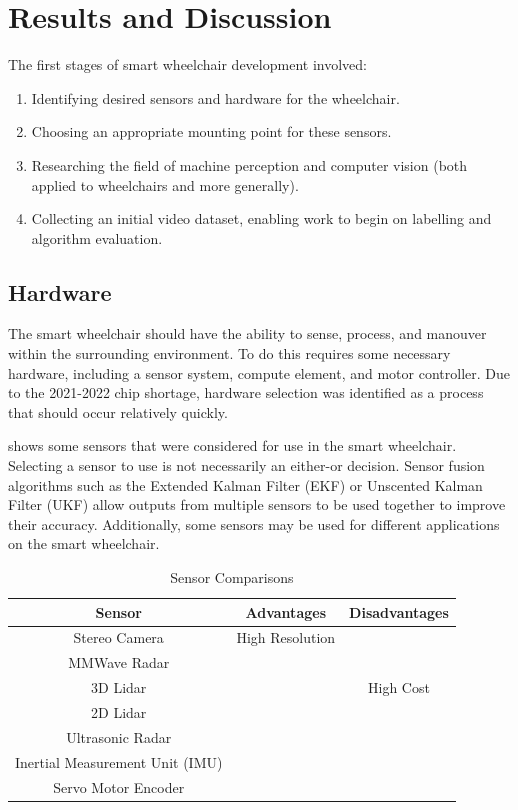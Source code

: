 \documentclass[12pt]{article}
\begin{document}
\pagebreak

\section{Results and Discussion}
The first stages of smart wheelchair development involved:
\begin{enumerate}
    \item Identifying desired sensors and hardware for the wheelchair.
    \item Choosing an appropriate mounting point for these sensors.
    \item Researching the field of machine perception and computer vision (both applied to wheelchairs and more generally).
    \item Collecting an initial video dataset, enabling work to begin on labelling and algorithm evaluation.
\end{enumerate}

\subsection{Hardware}
The smart wheelchair should have the ability to sense, process, and manouver within the surrounding environment.
To do this requires some necessary hardware, including a sensor system, compute element, and motor controller.
Due to the 2021-2022 chip shortage, hardware selection was identified as a process that should occur relatively quickly.

 shows some sensors that were considered for use in the smart wheelchair.
Selecting a sensor to use is not necessarily an either-or decision. Sensor fusion algorithms such as
the Extended Kalman Filter (EKF) or Unscented Kalman Filter (UKF) \cite{wanUnscentedKalmanFilter2000} allow
outputs from multiple sensors to be used together to improve their accuracy. Additionally, some sensors may
be used for different applications on the smart wheelchair.

\begin{table}
    \centering
    \begin{tabular}{c c c}
    \toprule
    Sensor & Advantages & Disadvantages \\
    \midrule
    Stereo Camera & High Resolution & \\
    MMWave Radar & & \\
    3D Lidar & & High Cost \\
    2D Lidar & & \\
    Ultrasonic Radar & & \\
    Inertial Measurement Unit (IMU) & & \\
    Servo Motor Encoder & & \\
    \bottomrule
    \end{tabular}
    \caption{Sensor Comparisons}
    \label{table:sensor_options}
\end{table}
\end{document}
